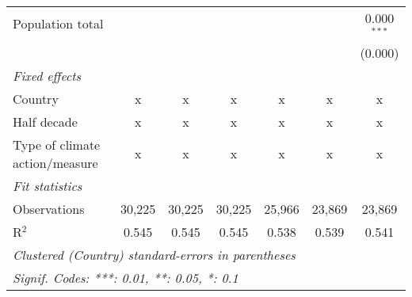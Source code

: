 \begin{tabular}{lcccccc}
   Population total                                                           &         &              &              &               &               & 0.000$^{***}$\\   
                                                                              &         &              &              &               &               & (0.000)\\   
   \emph{Fixed effects}\\
   Country                                                                    & x       & x            & x            & x             & x             & x\\  
   Half decade                                                                & x       & x            & x            & x             & x             & x\\  
   Type of climate action/measure                                             & x       & x            & x            & x             & x             & x\\  
   \midrule \emph{Fit statistics}\\
   Observations                                                               & 30,225  & 30,225       & 30,225       & 25,966        & 23,869        & 23,869\\  
   R$^2$                                                                      & 0.545   & 0.545        & 0.545        & 0.538         & 0.539         & 0.541\\  
   \midrule
   \multicolumn{7}{l}{\emph{Clustered (Country) standard-errors in parentheses}}\\
   \multicolumn{7}{l}{\emph{Signif. Codes: ***: 0.01, **: 0.05, *: 0.1}}\\
\end{tabular}
\par\endgroup


